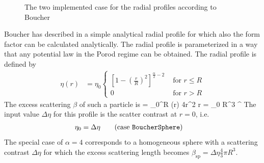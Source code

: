 \begin{figure}[htb]
\captionsetup[subfigure]{position=b}
\centering
{}
\hfill
{}
\caption{The two implemented case for the radial profiles according to Boucher \cite{Boucher1983}}
\label{fig:Boucherprofilea}
\end{figure}

Boucher  has described in \cite{Boucher1983} a simple analytical radial profile for which also the form factor can be calculated analytically. The radial profile is parameterized in a way that any potential law in the Porod regime can be obtained. The radial profile is defined by
\begin{align}
    \label{eq:profileBoucherSphere}
    \eta(r) &= \eta_0
    \begin{cases}
        \left[1-\left(\frac{r}{R}\right)^2 \right]^{\frac{\alpha}{2}-2} & \mbox{ for } r \leq R \\
        0 & \mbox{ for } r > R
    \end{cases}
\end{align}
The excess scattering $\beta$ of such a particle is
\BE
\beta = \int_0^R \eta(r) 4\pi r^2 r = \eta_0  R^3 \pi^{} 
\EE
The input value $\Delta\eta$ for this profile is the scatter contrast at $r=0$, i.e.
\begin{align}
\eta_0&=\Delta\eta \qquad \mbox{(case \texttt{BoucherSphere})}
\label{eq:eta0BoucherSphere}
\end{align}
The special case of $\alpha=4$ corresponds to a homogeneous sphere with a scattering contrast $\Delta\eta$ for which the excess scattering length becomes $\beta_\mathrm{sp}=\Delta\eta \frac{4}{3}\pi R^3$.

